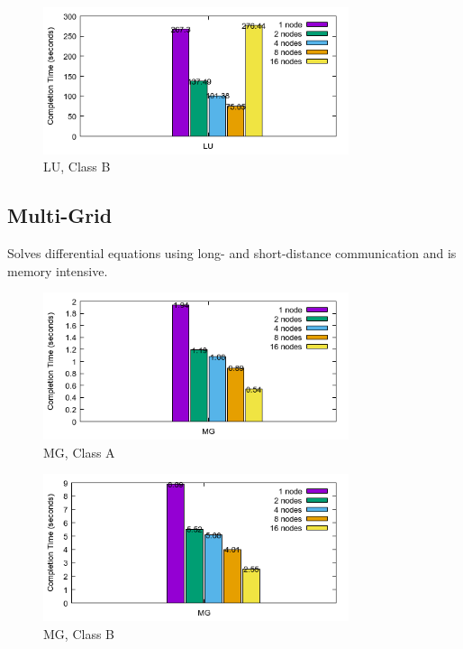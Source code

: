 \documentclass[a4paper]{article}
\begin{document}
\begin{figure}[H]
\centering
\includegraphics[width=0.8\textwidth]{figures/LUvB.png}
\caption{\label{fig:LUvB}LU, Class B}
\end{figure}

\subsection{Multi-Grid}

Solves differential equations using long- and short-distance communication and is memory intensive.

\begin{figure}[H]
\centering
\includegraphics[width=0.8\textwidth]{figures/MGvA.png}
\caption{\label{fig:MGvA}MG, Class A}
\end{figure}

\begin{figure}[H]
\centering
\includegraphics[width=0.8\textwidth]{figures/MGvB.png}
\caption{\label{fig:MGvB}MG, Class B}
\end{figure}



\end{document}

